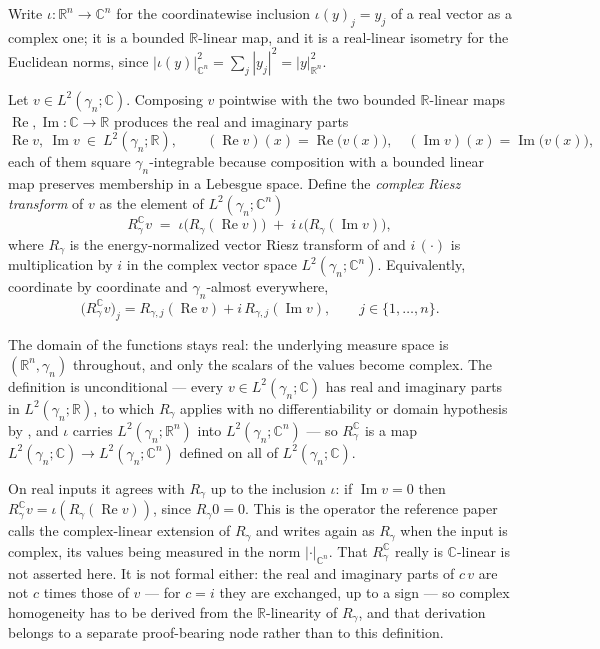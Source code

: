 \begin{definition}
Write $\iota : \mathbb{R}^n \to \mathbb{C}^n$ for the coordinatewise inclusion
$\iota(y)_j = y_j$ of a real vector as a complex one; it is a bounded
$\mathbb{R}$-linear map, and it is a real-linear isometry for the Euclidean
norms, since $|\iota(y)|_{\mathbb{C}^n}^2 = \sum_j |y_j|^2 = |y|_{\mathbb{R}^n}^2$.

Let $v \in L^2(\gamma_n;\mathbb{C})$.  Composing $v$ pointwise with the two
bounded $\mathbb{R}$-linear maps $\operatorname{Re},\operatorname{Im} :
\mathbb{C} \to \mathbb{R}$ produces the real and imaginary parts
\[
  \operatorname{Re} v, \ \operatorname{Im} v \ \in \ L^2(\gamma_n;\mathbb{R}),
  \qquad
  (\operatorname{Re} v)(x) = \operatorname{Re}\bigl(v(x)\bigr),
  \quad
  (\operatorname{Im} v)(x) = \operatorname{Im}\bigl(v(x)\bigr) ,
\]
each of them square $\gamma_n$-integrable because composition with a bounded
linear map preserves membership in a Lebesgue space.  Define the
\emph{complex Riesz transform} of $v$ as the element of
$L^2(\gamma_n;\mathbb{C}^n)$
\[
  R_\gamma^{\mathbb{C}} v
    \;=\; \iota\bigl(R_\gamma(\operatorname{Re} v)\bigr)
      \;+\; i\,\iota\bigl(R_\gamma(\operatorname{Im} v)\bigr) ,
\]
where $R_\gamma$ is the energy-normalized vector Riesz transform of
 and $i\,(\cdot)$ is multiplication by $i$ in the
complex vector space $L^2(\gamma_n;\mathbb{C}^n)$.  Equivalently, coordinate by
coordinate and $\gamma_n$-almost everywhere,
\[
  \bigl(R_\gamma^{\mathbb{C}} v\bigr)_j
    = R_{\gamma,j}(\operatorname{Re} v) + i\,R_{\gamma,j}(\operatorname{Im} v),
  \qquad j \in \{1,\ldots,n\} .
\]

The domain of the functions stays real: the underlying measure space is
$(\mathbb{R}^n,\gamma_n)$ throughout, and only the scalars of the values become
complex.  The definition is unconditional --- every $v \in L^2(\gamma_n;\mathbb{C})$
has real and imaginary parts in $L^2(\gamma_n;\mathbb{R})$, to which $R_\gamma$
applies with no differentiability or domain hypothesis by
, and $\iota$ carries $L^2(\gamma_n;\mathbb{R}^n)$ into
$L^2(\gamma_n;\mathbb{C}^n)$ --- so $R_\gamma^{\mathbb{C}}$ is a map
$L^2(\gamma_n;\mathbb{C}) \to L^2(\gamma_n;\mathbb{C}^n)$ defined on all of
$L^2(\gamma_n;\mathbb{C})$.

On real inputs it agrees with $R_\gamma$ up to the inclusion $\iota$: if
$\operatorname{Im} v = 0$ then $R_\gamma^{\mathbb{C}} v = \iota(R_\gamma
(\operatorname{Re} v))$, since $R_\gamma 0 = 0$.  This is the operator the
reference paper calls the complex-linear extension of $R_\gamma$ and writes
again as $R_\gamma$ when the input is complex, its values being measured in the
norm $|\cdot|_{\mathbb{C}^n}$.  That $R_\gamma^{\mathbb{C}}$ really is
$\mathbb{C}$-linear is not asserted here.  It is not formal either: the real
and imaginary parts of $c\,v$ are not $c$ times those of $v$ --- for $c = i$
they are exchanged, up to a sign --- so complex homogeneity has to be derived
from the $\mathbb{R}$-linearity of $R_\gamma$, and that derivation belongs to a
separate proof-bearing node rather than to this definition.
\end{definition}
